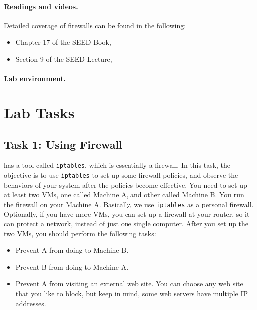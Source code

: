 \paragraph{Readings and videos.}
Detailed coverage of firewalls can be found in the following:

\begin{itemize}
\item Chapter 17 of the SEED Book, \seedbook
\item Section 9 of the SEED Lecture, \seedisvideo
\end{itemize}


\paragraph{Lab environment.} \seedenvironment



\section{Lab Tasks}



\subsection{Task 1: Using Firewall}

\linux has a tool called {\tt iptables}, which is essentially a firewall.
In this task, the objective is to use {\tt iptables} to set up some firewall policies, and 
observe the behaviors of your system after the policies become effective.
You need to set up at least two VMs, one called Machine A, and other called 
Machine B. You run the firewall on your Machine A. Basically, we use 
{\tt iptables} as a personal firewall. Optionally, if you have more VMs, you can 
set up a firewall at your router, so it can protect a network, instead of 
just one single computer. After you set up the two VMs, you should perform
the following tasks: 

\begin{itemize}
\item Prevent A from doing \telnet to Machine B.
\item Prevent B from doing \telnet to Machine A.
\item Prevent A from visiting an external web site. You can choose any web
site that you like to block, but keep in mind, some web servers have multiple
IP addresses. 
\end{itemize}


